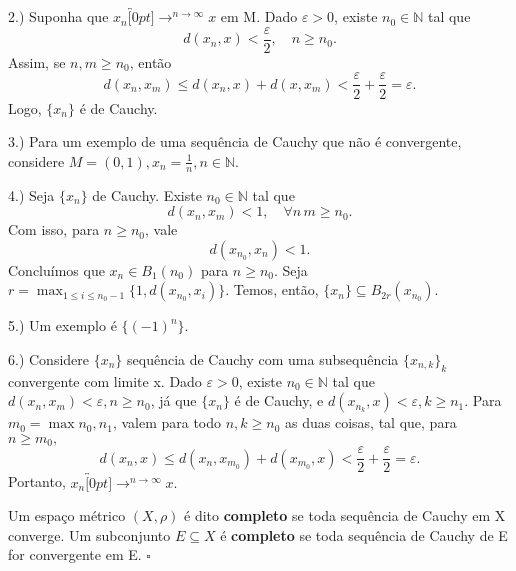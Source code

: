 \documentclass[MetricSpaces/metric_notes.tex]{subfiles}
\begin{document}
\begin{proof*}
	2.) Suponha que \(x_{n}\overbracket[0pt]{\longrightarrow}^{n\to \infty}x\) em M. Dado \(\varepsilon > 0\), existe \(n_{0}\in \mathbb{N}\) tal que
	\[
		d(x_{n}, x) < \frac{\varepsilon }{2},\quad n\geq n_{0}.
	\]
	Assim, se \(n, m\geq n_{0}\), então
	\[
		d(x_{n}, x_{m})\leq d(x_{n}, x) + d(x, x_{m}) < \frac{\varepsilon }{2}+\frac{\varepsilon }{2}=\varepsilon .
	\]
	Logo, \(\{x_{n}\}\) é de Cauchy.

	3.) Para um exemplo de uma sequência de Cauchy que não é convergente, considere \(M=(0, 1), x_{n}=\frac{1}{n},n\in \mathbb{N}\).

	4.) Seja \(\{x_{n}\}\) de Cauchy. Existe \(n_{0}\in \mathbb{N}\) tal que
	\[
		d(x_{n}, x_{m}) < 1,\quad \forall n\, m\geq n_{0}.
	\]
	Com isso, para \(n\geq n_{0}\), vale
	\[
		d(x_{n_{0}}, x_{n}) < 1.
	\]
	Concluímos que \(x_{n}\in B_{1}(n_{0})\) para \(n\geq n_{0}\). Seja \(r = \max_{1\leq i\leq n_{0}-1}\{1, d(x_{n_{0}}, x_{i})\}\). Temos, então,
	\(\{x_{n}\}\subseteq{B_{2r}(x_{n_{0}})}\).

	5.) Um exemplo é \(\{(-1)^{n}\}.\)

	6.) Considere \(\{x_{n}\}\) sequência de Cauchy com uma subsequência \(\{x_{n, k}\}_{k}\) convergente com limite x.
	Dado \(\varepsilon >0\), existe \(n_{0}\in \mathbb{N}\) tal que \(d(x_{n}, x_{m}) < \varepsilon , n\geq n_{0}\), já que \(\{x_{n}\}\) é de Cauchy,
	e \(d(x_{n_{k}}, x) < \varepsilon , k\geq n_{1}.\) Para \(m_{0}=\max{n_{0}, n_{1}}\), valem para
	todo \(n, k\geq n_{0}\) as duas coisas, tal que, para \(n\geq m_{0},\)
	\[
		d(x_{n}, x)\leq d(x_{n}, x_{m_{0}}) + d(x_{m_{0}}, x) < \frac{\varepsilon }{2} + \frac{\varepsilon }{2} = \varepsilon .
	\]
	Portanto, \(x_{n}\overbracket[0pt]{\longrightarrow}^{n\to \infty}x.\)
	\qedsymbol
\end{proof*}
\begin{def*}
	Um espaço métrico \((X, \rho )\) é dito \textbf{completo} se toda sequência de Cauchy em X converge. Um subconjunto \(E\subseteq{X}\) é \textbf{completo} se toda sequência de Cauchy de E for convergente em E. \(\square\)
\end{def*}
\end{document}
